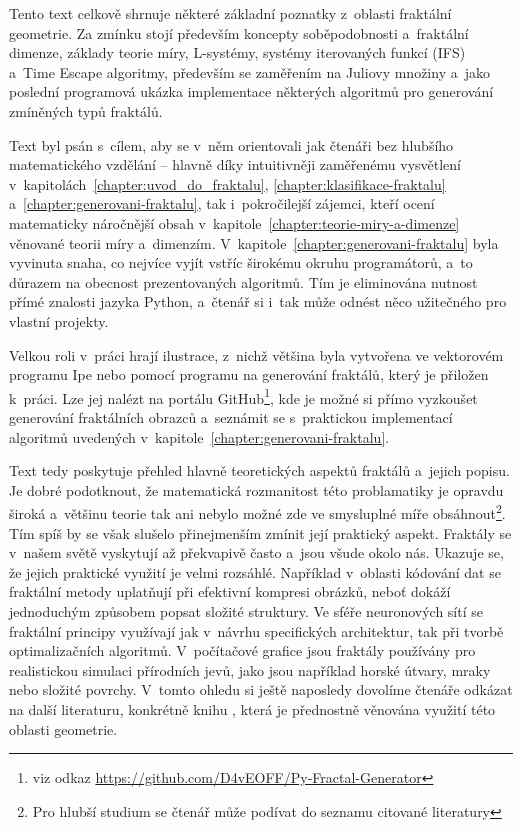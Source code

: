 
Tento text celkově shrnuje některé základní poznatky z~oblasti fraktální geometrie. Za zmínku stojí především koncepty soběpodobnosti a~fraktální dimenze, základy teorie míry, L-systémy, systémy iterovaných funkcí (IFS) a~Time Escape algoritmy, především se zaměřením na Juliovy množiny a~jako poslední programová ukázka implementace některých algoritmů pro generování zmíněných typů fraktálů.

Text byl psán s~cílem, aby se v~něm orientovali jak čtenáři bez hlubšího matematického vzdělání -- hlavně díky intuitivněji zaměřenému vysvětlení v~kapitolách~\ref{chapter:uvod_do_fraktalu}, \ref{chapter:klasifikace-fraktalu} a~\ref{chapter:generovani-fraktalu}, tak i~pokročilejší zájemci, kteří ocení matematicky náročnější obsah v~kapitole~\ref{chapter:teorie-miry-a-dimenze} věnované teorii míry a~dimenzím. V~kapitole~\ref{chapter:generovani-fraktalu} byla vyvinuta snaha, co nejvíce vyjít vstříc širokému okruhu programátorů, a~to důrazem na obecnost prezentovaných algoritmů. Tím je eliminována nutnost přímé znalosti jazyka Python, a~čtenář si i~tak může odnést něco užitečného pro vlastní projekty.

Velkou roli v~práci hrají ilustrace, z~nichž většina byla vytvořena ve vektorovém programu Ipe nebo pomocí programu na generování fraktálů, který je přiložen k~práci. Lze jej nalézt na portálu GitHub\footnote{viz odkaz \url{https://github.com/D4vEOFF/Py-Fractal-Generator}}, kde je možné si přímo vyzkoušet generování fraktálních obrazců a~seznámit se s~praktickou implementací algoritmů uvedených v~kapitole~\ref{chapter:generovani-fraktalu}.

Text tedy poskytuje přehled hlavně teoretických aspektů fraktálů a~jejich popisu. Je dobré podotknout, že matematická rozmanitost této problamatiky je opravdu široká a~většinu teorie tak ani nebylo možné zde ve smysluplné míře obsáhnout\footnote{Pro hlubší studium se čtenář může podívat do seznamu citované literatury}. Tím spíš by se však slušelo přinejmenším zmínit její praktický aspekt. Fraktály se v~našem světě vyskytují až překvapivě často a~jsou všude okolo nás. Ukazuje se, že jejich praktické využití je velmi rozsáhlé. Například v~oblasti kódování dat se fraktální metody uplatňují při efektivní kompresi obrázků, neboť dokáží jednoduchým způsobem popsat složité struktury. Ve sféře neuronových sítí se fraktální principy využívají jak v~návrhu specifických architektur, tak při tvorbě optimalizačních algoritmů. V~počítačové grafice jsou fraktály používány pro realistickou simulaci přírodních jevů, jako jsou například horské útvary, mraky nebo složité povrchy. V~tomto ohledu si ještě naposledy dovolíme čtenáře odkázat na další literaturu, konkrétně knihu \cite{Zelinka2006}, která je přednostně věnována využití této oblasti geometrie.

